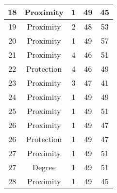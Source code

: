 \documentclass[results.tex]{subfiles}
\begin{document}
\begin{center}
\begin{tabular}{| c || c | c | c | c |}
            \hline
            18                      & Proximity                    & 1                      & 49                      & 45                   \\
            \hline
            19                      & Proximity                    & 2                      & 48                      & 53                   \\
            \hline
            20                      & Proximity                    & 1                      & 49                      & 57                   \\
            \hline
            21                      & Proximity                    & 4                      & 46                      & 51                   \\
            \hline
            22                      & Protection                   & 4                      & 46                      & 49                   \\
            \hline
            23                      & Proximity                    & 3                      & 47                      & 41                   \\
            \hline
            24                      & Proximity                    & 1                      & 49                      & 49                   \\
            \hline
            25                      & Proximity                    & 1                      & 49                      & 51                   \\
            \hline
            26                      & Proximity                    & 1                      & 49                      & 47                   \\
            \hline
            26                      & Protection                   & 1                      & 49                      & 47                   \\
            \hline
            27                      & Proximity                    & 1                      & 49                      & 51                   \\
            \hline
            27                      & Degree                       & 1                      & 49                      & 51                   \\
            \hline
            28                      & Proximity                    & 1                      & 49                      & 45                   \\

\end{tabular}
\end{center}
\end{document}
